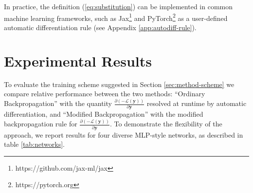 \documentclass{article}
\theoremstyle{plain}
\theoremstyle{definition}
\theoremstyle{remark}
\newcommand{\vy}{\mathbf{y}}
\newcommand{\pd}[2]{\frac{\partial{#1}}{\partial{#2}}}
\begin{document}
In practice, the definition (\ref{eq:substitution}) can be implemented in common machine learning frameworks, such as Jax\footnote{https://github.com/jax-ml/jax} and PyTorch\footnote{https://pytorch.org} as a user-defined automatic differentiation rule (see Appendix \ref{app:autodiff-rule}).

\section{Experimental Results}
\label{sec:experiment}
To evaluate the training scheme suggested in Section \ref{sec:method-scheme} we compare relative performance between the two methods: ``Ordinary Backpropagation'' with the quantity $\pd{(-\mathcal{L}(\vy))}{\vy}$ resolved at runtime by automatic differentiation, and ``Modified Backpropagation'' with the modified backpropagation rule for $\pd{(-\mathcal{L}(\vy))}{\vy}$. To demonstrate the flexibility of the approach, we report results for four diverse MLP-style networks, as described in table \ref{tab:networks}.
\end{document}

